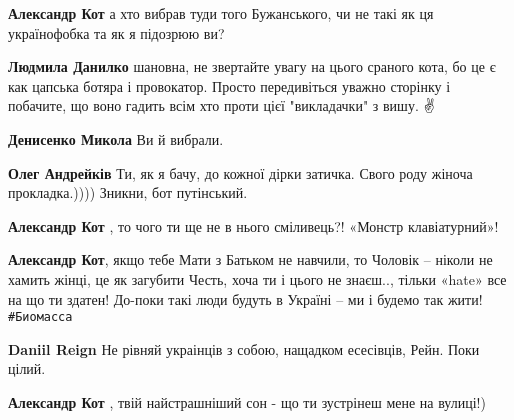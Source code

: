 \begin{itemize}
\begin{itemize}
\textbf{Александр Кот} а хто вибрав туди того Бужанського, чи не такі як ця українофобка та як я підозрюю ви?


\textbf{Людмила Данилко} шановна, не звертайте увагу на цього сраного кота, бо це є как цапська ботяра і провокатор. Просто передивіться уважно сторінку і побачите, що воно гадить всім хто проти цієї "викладачки" з вишу. ✌️


\textbf{Денисенко Микола} Ви й вибрали.


\textbf{Олег Андрейків} Ти, як я бачу, до кожної дірки затичка. Свого роду жіноча прокладка.)))) Зникни, бот путінський.


\textbf{Александр Кот} , то чого ти ще не в нього сміливець?! «Монстр клавіатурний»!🤣🤣🤣


\textbf{Александр Кот}, якщо тебе Мати з Батьком не навчили, то Чоловік – ніколи не хамить жінці, це як загубити Честь, хоча ти і цього не знаєш.., тільки «hate» все на що ти здатен!
До-поки такі люди будуть в Україні – ми і будемо так жити! \verb|#Биомасса|


\textbf{Daniil Reign} Не рівняй украінців з собою, нащадком есесівців, Рейн. Поки цілий.


\textbf{Александр Кот} , твій найстрашніший сон - що ти зустрінеш мене на вулиці!)



\end{itemize}
\end{itemize}
